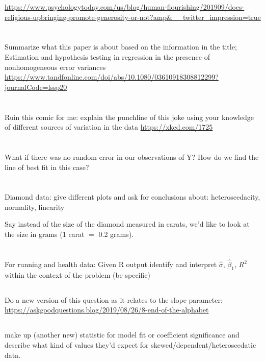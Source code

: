 \documentclass[11pt]{article}
\begin{document}
\href{psychology today paper}{https://www.psychologytoday.com/us/blog/human-flourishing/201909/does-religious-upbringing-promote-generosity-or-not?amp\&\_\_twitter\_impression=true}



\section{} Summarize what this paper is about based on the information in the title; 
Estimation and hypothesis testing in regression in the presence of nonhomogeneous error variances
\href{statistics article}{https://www.tandfonline.com/doi/abs/10.1080/03610918308812299?journalCode=lssp20}


\section{} Ruin this comic for me: explain the punchline of this joke using your knowledge of different sources of variation in the data 
\href{}{https://xkcd.com/1725}


\section{} What if there was no random error in our observations of Y? How do we find the line of best fit in this case?


\section{} Diamond data: give different plots and ask for conclusions about: heteroscedacity, normality, linearity

Say instead of the size of the diamond measured in carats, we'd like to look at the size in grams (1 carat $=$ 0.2 grams). 

\section{}
\subsection{} For running and health data: Given R output identify and interpret $\hat{\sigma}$, $\hat{\beta}_1$, $R^2$ within the context of the problem (be specific)

\subsection{}
Do a new version of this question as it relates to the slope parameter:  \href{}{https://askgoodquestions.blog/2019/08/26/8-end-of-the-alphabet}

\subsection{} make up (another new) statistic for model fit or coefficient significance and describe what kind of values they'd expect for skewed/dependent/heteroscedatic data. 


\end{document}
